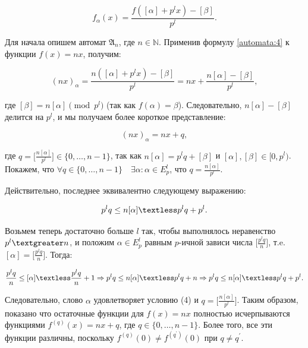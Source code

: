 \documentclass[och, master]{SCWorks}
\theoremstyle{plain}
\theoremstyle{plain}
\theoremstyle{plain}
\theoremstyle{definition}
\begin{document}
\begin{equation} \label{automata:4}
f_{\alpha}(x)=\frac{f([\alpha]+p^{l}x)-[\beta]}{p^l}.
\end{equation}

\noindent Для начала опишем автомат $\mathfrak{A}_n$, где $n \in \mathbb N$. Применив формулу \ref{automata:4} к функции $f(x)=nx$, получим:

\begin{equation} \label{automata:5}
(nx)_{\alpha}=\frac{n([\alpha]+p^{l}x)-[\beta]}{p^l}	=nx+\frac{n[\alpha]-[\beta]}{p^l},
\end{equation}

\noindent где $[\beta]=n[\alpha] \pmod {p^l}$ (так как $f(\alpha)=\beta$). Следовательно, $n[\alpha]-[\beta]$ делится на $p^l$, и мы получаем более короткое представление:

\begin{equation} \label{automata:6}
(nx)_{\alpha}=nx+q,	
\end{equation}

\noindent где $q=\bigg[\frac{n[\alpha]}{p^l}\bigg] \in \{0, \ldots, n-1\}$, так как $n[\alpha]=p^l q+[\beta]$ и $[\alpha],[\beta] \in [0,p^l)$. Покажем, что $\forall q \in \{0, \ldots, n-1\} \quad \exists \alpha: \alpha \in E^l_p$, что  $q=\frac{n[\alpha]}{p^l}$.

\noindent Действительно, последнее эквивалентно следующему выражению:

\begin{equation} \label{automata:7}
p^l q \leq n[\alpha] \textless p^l q+ p^l.	
\end{equation}

\noindent Возьмем теперь достаточно больше $l$ так, чтобы выполнялось неравенство $p^l \textgreater n$, и положим $\alpha \in E^l_p$ равным $p$-ичной зависи числа $\bigg[\frac{p^l q}{n}\bigg]$, т.e. $[\alpha]=\bigg[\frac{p^l q}{n}\bigg]$. Тогда:

\begin{equation} \label{automata:8}
\frac{p^l q}{n} \leq [\alpha] \textless \frac{p^l q}{n} + 1 \Rightarrow p^l q \leq n[\alpha] \textless p^l q +n \Rightarrow p^l q \leq n[\alpha] \textless p^l q + p^l.
\end{equation}

\noindent Следовательно, слово $\alpha$ удовлетворяет условию (4) и $q=\bigg[\frac{n[\alpha]}{p^l}\bigg]$. Таким образом, показано что остаточные функции для $f(x)=nx$ полностью исчерпываются функциями $f^{(q)}(x)=nx+q$, где $q \in \{0, \ldots, n-1 \}$. Более того, все эти функции различны, поскольку $f^{(q)}(0) \neq f^{(q^{'})}(0)$ при $q \neq q^{'}$.
\end{document}
